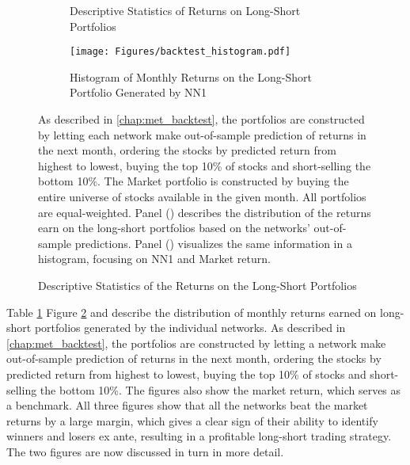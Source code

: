 		
		\begin{figure}	
			\centering		
			\begin{subfigure}[t]{\textwidth}
				\centering	
				
				\caption{Descriptive Statistics of Returns on Long-Short Portfolios}
				\label{tab:backtest_descriptives_models}
			\end{subfigure}
			
			\begin{subfigure}[t]{\textwidth}
				\texttt{[image: Figures/backtest\_histogram.pdf]}
				\caption{Histogram of Monthly Returns on the Long-Short Portfolio Generated by NN1}
				\label{fig:backtest_histogram}
			\end{subfigure}
			\caption{Descriptive Statistics of the Returns on the Long-Short Portfolios}
			\medskip
			\small
			As described in \ref{chap:met_backtest}, the portfolios are constructed by letting each network make out-of-sample prediction of returns in the next month, ordering the stocks by predicted return from highest to lowest, buying the top 10\% of stocks and short-selling the bottom 10\%. The Market portfolio is constructed by buying the entire universe of stocks available in the given month. All portfolios are equal-weighted. Panel () describes the distribution of the returns earn on the long-short portfolios based on the networks' out-of-sample predictions. Panel () visualizes the same information in a histogram, focusing on NN1 and Market return. 
			\label{fig:backtest_descriptives}
		\end{figure} 
			
		Table \ref{tab:backtest_descriptives_models} Figure \ref{fig:backtest_histogram}  and describe the distribution of monthly returns earned on long-short portfolios generated by the individual networks. As described in \ref{chap:met_backtest}, the portfolios are constructed by letting a network make out-of-sample prediction of returns in the next month, ordering the stocks by predicted return from highest to lowest, buying the top 10\% of stocks and short-selling the bottom 10\%. The figures also show the market return, which serves as a benchmark. All three figures show that all the networks beat the market returns by a large margin, which gives a clear sign of their ability to identify winners and losers ex ante, resulting in a profitable long-short trading strategy. The two figures are now discussed in turn in more detail.
		
